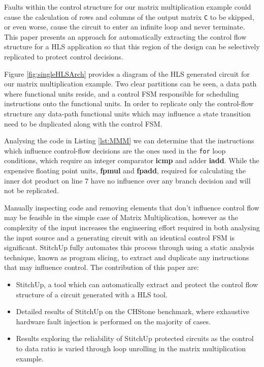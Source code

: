 Faults within the control structure for our matrix multiplication example
could cause the calculation of rows and columns of the output matrix \lstinline$C$ to be skipped,
or even worse, cause the circuit to enter an infinite loop and never terminate.
This paper presents an approach for automatically extracting the control flow structure
for a HLS application so that this region of the design can be selectively
replicated to protect control decisions.

Figure \ref{fig:singleHLSArch} provides a diagram of the HLS generated
circuit for our matrix multiplication example.
Two clear partitions can be seen, a data path where functional units reside, and a
control FSM responsible for scheduling instructions onto the functional units.
In order to replicate only the control-flow structure
any data-path functional units which may influence a state transition need to be
duplicated along with the control FSM.

Analysing the code in Listing \ref{lst:MMM} we can determine that the instructions
which influence control-flow decisions are the ones used in the \lstinline{for} loop
conditions, which require an integer comparator \textbf{icmp} and adder \textbf{iadd}.
While the expensive floating point units, \textbf{fpmul} and \textbf{fpadd}, required
for calculating the inner dot product on line 7 have no
influence over any branch decision and will not be replicated.

Manually inspecting code and removing elements that don't influence control flow
may be feasible in the simple case of Matrix Multiplication, however as the complexity of the input increases
the engineering effort required in both analysing the input source and a generating circuit with an identical control FSM is
significant.
StitchUp fully automates this process through using a static analysis technique, known as program slicing, to extract
and duplicate any instructions that may influence control. The contribution of this paper are:
\vspace{-8pt}
\begin{itemize}
	\setlength{\itemsep}{1pt}
	\setlength{\parskip}{0pt}
	\setlength{\parsep}{0pt}
	\item StitchUp, a tool which can automatically extract and protect the control flow structure of a circuit generated with a HLS tool.
	\item Detailed results of StitchUp on the CHStone benchmark, where exhaustive hardware fault injection is performed on the majority of cases.
	\item Results exploring the reliability of StitchUp protected circuits as the control to data ratio is varied through
	loop unrolling in the matrix multiplication example.
\end{itemize}

